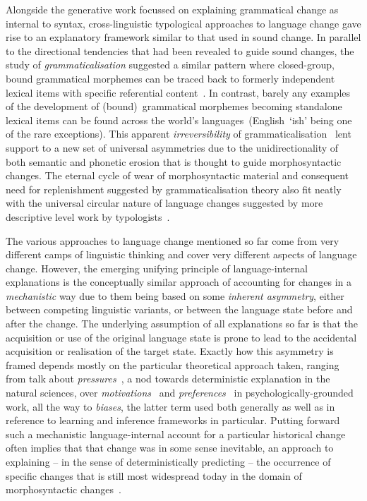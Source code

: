 Alongside the generative work focussed on explaining grammatical change as internal to syntax, cross-linguistic typological approaches to language change gave rise to an explanatory framework similar to that used in sound change. In parallel to the directional tendencies that had been revealed to guide sound changes, the study of \emph{grammaticalisation} suggested a similar pattern where closed-group, bound grammatical morphemes can be traced back to formerly independent lexical items with specific referential content~\citep{Hopper1993}.
In contrast, barely any examples of the development of (bound)~grammatical morphemes becoming standalone lexical items can be found across the world's languages~(English~`ish' being one of the rare exceptions).
This apparent \emph{irreversibility} of grammaticalisation~\citep{Haspelmath2004directionality} lent support to a new set of universal asymmetries due to the unidirectionality of both semantic and phonetic erosion that is thought to guide morphosyntactic changes. The eternal cycle of wear of morphosyntactic material and consequent need for replenishment suggested by grammaticalisation theory also fit neatly with the universal circular nature of language changes suggested by more descriptive level work by typologists~\citep{Hodge1970}.

The various approaches to language change mentioned so far come from very different camps of linguistic thinking and cover very different aspects of language change.
However, the emerging unifying principle of language-internal explanations is the conceptually similar approach of accounting for changes in a \emph{mechanistic} way due to them being based on some \emph{inherent asymmetry}, either between competing linguistic variants, or between the language state before and after the change. The underlying assumption of all explanations so far is that the acquisition or use of the original language state is prone to lead to the accidental acquisition or realisation of the target state. Exactly how this asymmetry is framed depends mostly on the particular theoretical approach taken, ranging from talk about \emph{pressures}~\citep[e.g.][]{Thomsen2006}, a nod towards deterministic explanation in the natural sciences, over \emph{motivations}~\citep{MacWhinney2014} and \emph{preferences}~\citep{Fedzechkina2016} in psychologically-grounded work, all the way to \emph{biases}, the latter term used both generally as well as in reference to learning and inference frameworks in particular.
Putting forward such a mechanistic language-internal account for a particular historical change often implies that that change was in some sense inevitable, an approach to explaining -- in the sense of deterministically predicting -- the occurrence of specific changes that is still most widespread today in the domain of morphosyntactic changes~\citep{Lightfoot2010}.

